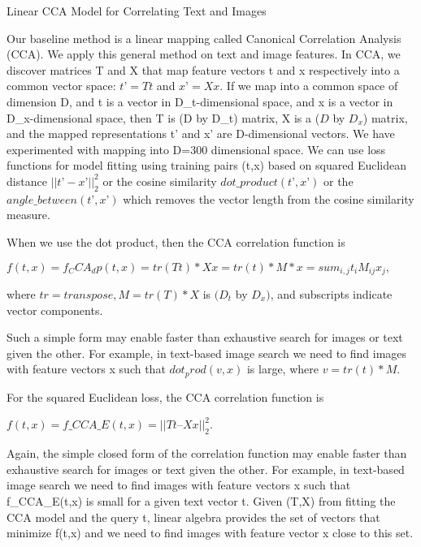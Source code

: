 \documentclass[runningheads]{llncs}
\begin{document}
Linear CCA Model for Correlating Text and Images

Our baseline method is a linear mapping called Canonical Correlation Analysis (CCA). We apply this general method on text and image features. In CCA, we discover matrices T and X that map feature vectors t and x respectively into a common vector space: $t’= Tt$ and $x’=Xx$. If we map into a common space of dimension D, and t is a vector in D\_t-dimensional space, and x is a vector in D\_x-dimensional space, then T is (D by D\_t) matrix, X is a ($D$ by $D_x$) matrix, and the mapped representations t’ and x’ are D-dimensional vectors. We have experimented with mapping into D=300 dimensional space. We can use loss functions for model fitting using training pairs (t,x) based on squared Euclidean distance $||t’-x’||_2^2$ or the cosine similarity $dot\_product(t’,x’)$ or the $angle\_between(t’,x’)$ which removes the vector length from the cosine similarity measure.

When we use the dot product, then the CCA correlation function is

$f(t,x) = f_CCA_dp(t,x) = tr(Tt) * Xx = tr(t)*M*x = sum_{i,j} t_i M_{ij} x_j,$

where $tr=transpose, M=tr(T)*X$ is $(D_t$ by $D_x)$, and subscripts indicate vector components.

Such a simple form may enable faster than exhaustive search for images or text given the other. For example, in text-based image search we need to find images with feature vectors x such that $dot_prod(v,x)$ is large, where $v=tr(t)*M$.

For the squared Euclidean loss, the CCA correlation function is

$f(t,x) = f\_CCA\_E(t,x) = ||T t – X x||_2^2$.

Again, the simple closed form of the correlation function may enable faster than exhaustive search for images or text given the other. For example, in text-based image search we need to find images with feature vectors x such that f\_CCA\_E(t,x) is small for a given text vector t. Given (T,X) from fitting the CCA model and the query t, linear algebra provides the set of vectors that minimize f(t,x) and we need to find images with feature vector x close to this set.
\end{document}
